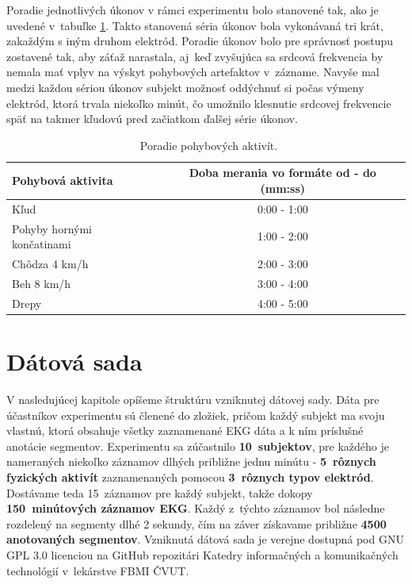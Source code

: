 Poradie jednotlivých úkonov v rámci experimentu bolo stanovené tak, ako je uvedené v~tabuľke \ref{tab:activities}. Takto stanovená séria úkonov bola vykonávaná tri krát, zakaždým s iným druhom elektród. Poradie úkonov bolo pre správnosť postupu zostavené tak, aby záťaž narastala, aj~keď zvyšujúca sa srdcová frekvencia by nemala mať vplyv na výskyt pohybových artefaktov v~zázname. Navyše mal medzi každou sériou úkonov subjekt možnosť oddýchnuť si počas výmeny elektród, ktorá trvala niekoľko minút, čo umožnilo klesnutie srdcovej frekvencie späť na takmer kľudovú pred začiatkom ďalšej série úkonov. 

\begin{table}[H]\centering
\caption[Poradie pohybových aktivít.]{~Poradie pohybových aktivít.}\label{tab:activities}
    \begin{tabular}{l|c}
    	\textbf{Pohybová aktivita}  & \textbf{Doba merania vo formáte od - do (mm:ss)}        \tabularnewline \hline 
     	Kľud                        & 0:00 - 1:00                                   \tabularnewline \hline
     	Pohyby hornými končatinami	& 1:00 - 2:00                                   \tabularnewline \hline
        Chôdza 4 km/h           	& 2:00 - 3:00                                   \tabularnewline \hline
        Beh	8 km/h                  & 3:00 - 4:00                                   \tabularnewline \hline
        Drepy	                    & 4:00 - 5:00                                   \tabularnewline 
    \end{tabular}
\end{table}



\chapter{Dátová sada}

V nasledujúcej kapitole opíšeme štruktúru vzniknutej dátovej sady. Dáta pre účastníkov experimentu sú členené do zložiek, pričom každý subjekt ma svoju vlastnú, ktorá obsahuje všetky zaznamenané EKG dáta a k ním príslušné anotácie segmentov. Experimentu sa zúčastnilo \textbf{10~subjektov}, pre každého je nameraných niekoľko záznamov dlhých približne jednu minútu - \textbf{5~rôznych fyzických aktivít} zaznamenaných pomocou \textbf{3~rôznych typov elektród}. Dostávame teda 15~záznamov pre každý subjekt, takže dokopy \textbf{150~minútových záznamov EKG}. Každý z~týchto záznamov bol následne rozdelený na segmenty dlhé 2 sekundy, čím na záver získavame približne \textbf{4500 anotovaných segmentov}. Vzniknutá dátová sada je verejne dostupná pod GNU GPL 3.0 licenciou na GitHub repozitári Katedry informačných a komunikačných technológií v~lekárstve FBMI ČVUT.

